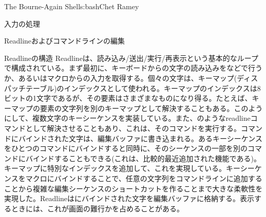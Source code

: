 \begin{aosachapter}{The Bourne-Again Shell}{s:bash}{Chet Ramey}
\begin{aosasect1}{入力の処理}
\begin{aosasect2}{Readlineおよびコマンドラインの編集}
\begin{aosasect3}{Readlineの構造}
Readlineは、読み込み/送出/実行/再表示という基本的なループで構成されている。まず最初に、キーボードからの文字の読み込みをなどで行うか、あるいはマクロからの入力を取得する。個々の文字は、キーマップ(ディスパッチテーブル)のインデックスとして使われる。キーマップのインデックスは8ビットの1文字であるが、その要素はさまざまなものになり得る。たとえば、キーマップの要素の文字列を別のキーマップとして解決することもある。このようにして、複数文字のキーシーケンスを実装している。また、のようなreadlineコマンドとして解決させることもあり、これは、そのコマンドを実行する。コマンドにバインドされた文字は、編集バッファに書き込まれる。あるキーシーケンスをひとつのコマンドにバインドすると同時に、そのシーケンスの一部を別のコマンドにバインドすることもできる(これは、比較的最近追加された機能である)。キーマップに特別なインデックスを追加して、これを実現している。キーシーケンスをマクロにバインドすることで、任意の文字列をコマンドラインに追加することから複雑な編集シーケンスのショートカットを作ることまで大きな柔軟性を実現した。Readlineはにバインドされた文字を編集バッファに格納する。表示するときには、これが画面の難行かを占めることがある。


\end{aosasect3}
\end{aosasect2}
\end{aosasect1}
\end{aosachapter}
